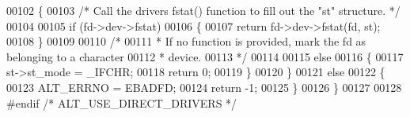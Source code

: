 \begin{DoxyCode}
00102   \{
00103     \textcolor{comment}{/* Call the drivers fstat() function to fill out the "st" structure. */}
00104 
00105     \textcolor{keywordflow}{if} (fd->dev->fstat)
00106     \{
00107       \textcolor{keywordflow}{return} fd->dev->fstat(fd, st);
00108     \}
00109 
00110     \textcolor{comment}{/* }
00111 \textcolor{comment}{     * If no function is provided, mark the fd as belonging to a character }
00112 \textcolor{comment}{     * device.}
00113 \textcolor{comment}{     */}
00114  
00115     \textcolor{keywordflow}{else}
00116     \{
00117       st->st\_mode = \_IFCHR;
00118       \textcolor{keywordflow}{return} 0;
00119     \}
00120   \}
00121   \textcolor{keywordflow}{else}
00122   \{
00123     ALT_ERRNO = EBADFD;
00124     \textcolor{keywordflow}{return} -1;
00125   \}
00126 \}
00127 
00128 \textcolor{preprocessor}{#endif }\textcolor{comment}{/* ALT\_USE\_DIRECT\_DRIVERS */}\textcolor{preprocessor}{}
\end{DoxyCode}
